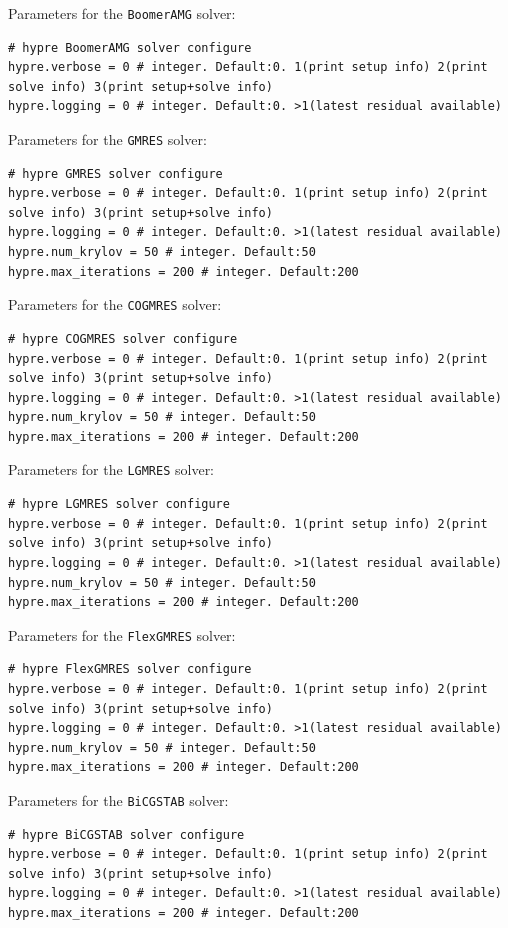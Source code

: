 \documentclass[11pt]{article}
\begin{document}
\begin{itemize}
Parameters for the \verb|BoomerAMG| solver:
\begin{lstlisting}[language=pkgconfig]
# hypre BoomerAMG solver configure
hypre.verbose = 0 # integer. Default:0. 1(print setup info) 2(print solve info) 3(print setup+solve info)
hypre.logging = 0 # integer. Default:0. >1(latest residual available)
\end{lstlisting}

Parameters for the \verb|GMRES| solver:
\begin{lstlisting}[language=pkgconfig]
# hypre GMRES solver configure
hypre.verbose = 0 # integer. Default:0. 1(print setup info) 2(print solve info) 3(print setup+solve info)
hypre.logging = 0 # integer. Default:0. >1(latest residual available)
hypre.num_krylov = 50 # integer. Default:50
hypre.max_iterations = 200 # integer. Default:200
\end{lstlisting}

Parameters for the \verb|COGMRES| solver:
\begin{lstlisting}[language=pkgconfig]
# hypre COGMRES solver configure
hypre.verbose = 0 # integer. Default:0. 1(print setup info) 2(print solve info) 3(print setup+solve info)
hypre.logging = 0 # integer. Default:0. >1(latest residual available)
hypre.num_krylov = 50 # integer. Default:50
hypre.max_iterations = 200 # integer. Default:200
\end{lstlisting}

Parameters for the \verb|LGMRES| solver:
\begin{lstlisting}[language=pkgconfig]
# hypre LGMRES solver configure
hypre.verbose = 0 # integer. Default:0. 1(print setup info) 2(print solve info) 3(print setup+solve info)
hypre.logging = 0 # integer. Default:0. >1(latest residual available)
hypre.num_krylov = 50 # integer. Default:50
hypre.max_iterations = 200 # integer. Default:200
\end{lstlisting}

Parameters for the \verb|FlexGMRES| solver:
\begin{lstlisting}[language=pkgconfig]
# hypre FlexGMRES solver configure
hypre.verbose = 0 # integer. Default:0. 1(print setup info) 2(print solve info) 3(print setup+solve info)
hypre.logging = 0 # integer. Default:0. >1(latest residual available)
hypre.num_krylov = 50 # integer. Default:50
hypre.max_iterations = 200 # integer. Default:200
\end{lstlisting}

Parameters for the \verb|BiCGSTAB| solver:
\begin{lstlisting}[language=pkgconfig]
# hypre BiCGSTAB solver configure
hypre.verbose = 0 # integer. Default:0. 1(print setup info) 2(print solve info) 3(print setup+solve info)
hypre.logging = 0 # integer. Default:0. >1(latest residual available)
hypre.max_iterations = 200 # integer. Default:200
\end{lstlisting}


\end{itemize}
\end{document}
